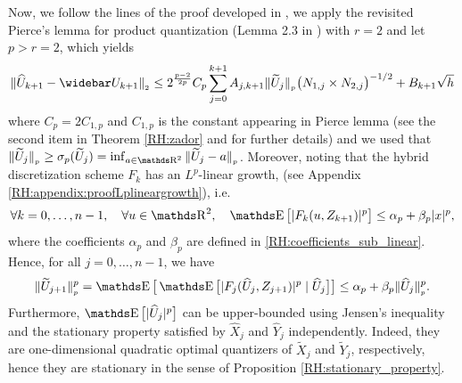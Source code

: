 \medskip
Now, we follow the lines of the proof developed in \cite{sagna2018general}, we apply the revisited Pierce's lemma for product quantization (Lemma 2.3 in \cite{sagna2018general}) with $r=2$ and let $p>r=2$, which yields
\begin{equation} \label{RH:step_proof_error_l2}
	\Vert \widehat U_{k+1} - \widebar U_{k+1} \Vert_{_2} \leq 2^{\frac{p-2}{2p}} C_p  \sum_{j=0}^{k+1} A_{j,k+1} \Vert \widetilde U_j \Vert_{_p} \big( N_{1,j} \times N_{2,j} \big)^{-1/2} + B_{k+1} \sqrt{h}
\end{equation}
where $C_p = 2 C_{1,p}$ and $C_{1,p}$ is the constant appearing in Pierce lemma (see the second item in Theorem \ref{RH:zador} and \cite{graf2000foundations} for further details) and we used that $\Vert \widetilde U_j \Vert_{_p} \geq \sigma_p (\widetilde U_j) = \inf_{a \in \R^2} \Vert \widetilde U_j - a \Vert_{_p}$.
Moreover, noting that the hybrid discretization scheme $F_k$ has an $L^p$-linear growth, (see Appendix \ref{RH:appendix:proofLplineargrowth}), i.e.
\begin{equation}
	\forall k = 0, \dots, n-1, \quad \forall u \in \R^2, \quad \E \big[ \vert F_k(u, Z_{k+1}) \vert^p \big] \leq \alpha_{p} + \beta_{p} \vert x \vert^p,
\end{equation}
where the coefficients $\alpha_{p}$ and $\beta_{p}$ are defined in \eqref{RH:coefficients_sub_linear}. Hence, for all $j = 0, \dots, n-1$, we have
\begin{equation}\label{RH:step_proof_norm_l2_of_widetildeU}
	\Vert \widetilde U_{j+1} \Vert_{_p}^p = \E \big[ \E \big[ \vert F_j ( \widehat U_j, Z_{j+1} ) \vert^p \mid \widehat U_j \big] \big] \leq \alpha_{p} + \beta_{p} \Vert \widehat U_j \Vert_{_p}^p.
\end{equation}
Furthermore, $\E \big[ \vert \widehat U_j \vert^p \big]$ can be upper-bounded using Jensen's inequality and the stationary property satisfied by $\widehat X_j$ and $\widehat Y_j$ independently. Indeed, they are one-dimensional quadratic optimal quantizers of $\widetilde X_j$ and $\widetilde Y_j$, respectively, hence they are stationary in the sense of Proposition \ref{RH:stationary_property}.
